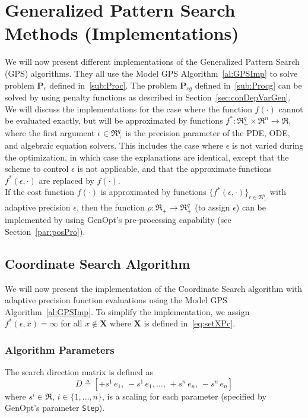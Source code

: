 \section{Generalized Pattern Search Methods (Implementations)}
We will now present different implementations of the Generalized
Pattern Search (GPS) algorithms.
They all use the Model GPS Algorithm~\ref{al:GPSImp} to solve
problem $\mathbf P_{c}$ defined in~\eqref{sub:Proc}.
The problem $\mathbf P_{cg}$ defined in~\eqref{sub:Procg} can be solved
by using penalty functions as described in Section~\ref{sec:conDepVarGen}.\\

We will discuss the implementations for the case where
the function $f(\cdot)$ cannot be evaluated exactly,
but will be approximated by functions $f^* \colon \Re_+^q \times \Re^n 
\to \Re$, where the first argument $\epsilon \in \Re_+^q$ is 
the precision parameter of the 
PDE, ODE, and algebraic equation solvers.
This includes the case where $\epsilon$ 
is not varied during the optimization, in which case
the explanations are identical, except that the scheme to
control $\epsilon$ is not applicable, and that
the approximate functions $f^*(\epsilon,\cdot)$ are replaced by $f(\cdot)$.\\


If the cost function $f(\cdot)$ is approximated by
functions $\{ f^*(\epsilon,\cdot)\}_{\epsilon \in \Re_+^q}$
with adaptive precision $\epsilon$, then
the function $\rho \colon \Re_+ \to \Re_+^q$ (to assign $\epsilon$)
can be implemented by using GenOpt's pre-processing capability
(see Section~\ref{par:posPro}).\\

\subsection{Coordinate Search Algorithm}
We will now present the implementation of the Coordinate Search 
algorithm
with adaptive precision function evaluations
using the Model GPS Algorithm~\ref{al:GPSImp}.
To simplify the implementation, we assign
$f^*(\epsilon,x) = \infty$ for all $x \not \in \mathbf X$ where
$\mathbf X$ is defined in~\eqref{eq:setXPc}.

\subsubsection{Algorithm Parameters}
The search direction matrix is defined as 
\begin{equation}
   D \triangleq [+s^1 \, e_1, \, -s^1 \, e_1, \ldots , 
\, +s^n \, e_n, \, -s^n \, e_n]
\label{eq:defDMatGPSCooSea}
\end{equation}
where $s^i \in \Re$, $i \in \{1, \ldots, n \}$, is a scaling for each parameter
(specified by GenOpt's parameter \texttt{Step}).\\

